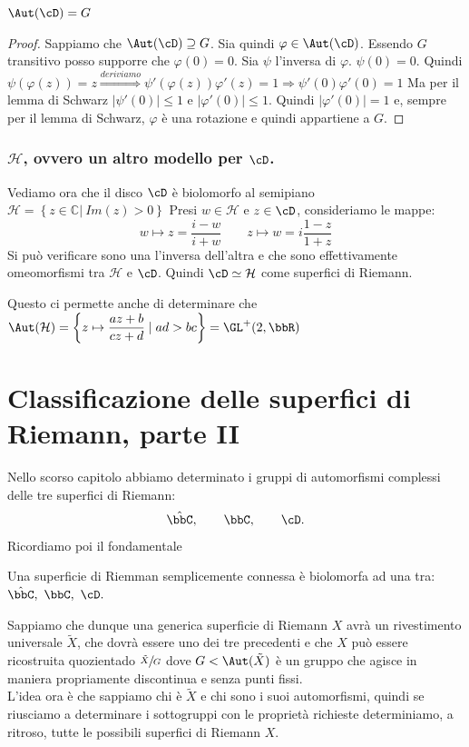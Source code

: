 \begin{proposizione}
$\Aut(\cD)=G$
\end{proposizione}
\begin{proof}
Sappiamo che $\Aut(\cD) \supseteq G$. Sia quindi $\varphi \in \Aut(\cD)$. Essendo $G$ transitivo posso supporre che $\varphi(0)=0$.
Sia $\psi$ l'inversa di $\varphi$. $\psi (0)=0$. Quindi
$\psi (\varphi (z))=z \stackrel{deriviamo}{\Longrightarrow} \psi ' (\varphi (z)) \varphi '(z) =1 \Rightarrow \psi'(0) \varphi'(0) =1$
Ma per il lemma di Schwarz $|\psi'(0)| \leq 1$ e $|\varphi'(0)| \leq 1$. Quindi $|\varphi'(0)|=1$ e, sempre per il lemma di Schwarz,
$\varphi$ è una rotazione e quindi appartiene a $G$.
\end{proof}

\subsection {$\mathcal{H}$, ovvero un altro modello per $\cD$.}

Vediamo ora che il disco $\cD$ è biolomorfo al semipiano $\mathcal{H} = \left \{ z \in \mathbb{C} | \ Im (z)>0 \right \}$
Presi $w \in \mathcal{H}$ e $z \in \cD$, consideriamo le mappe:
$$w \mapsto z=\frac{i-w}{i+w} \qquad z \mapsto w= i\frac{1-z}{1+z}$$
Si può verificare sono una l'inversa dell'altra e che sono effettivamente omeomorfismi tra $\mathcal{H}$ e $\cD$.
Quindi $\cD \simeq \mathcal{H}$ come superfici di Riemann.

Questo ci permette anche di determinare che $\Aut( \mathcal{H}) = \left \{ z \mapsto \displaystyle{\frac{az+b}{cz+d}} \mid ad > bc \right \} = \GL^+ (2, \bbR)$


\chapter{Classificazione delle superfici di Riemann, parte II}

Nello scorso capitolo abbiamo determinato i gruppi di automorfismi complessi delle tre superfici di Riemann:
$$
\hat{\bbC},\qquad \bbC, \qquad \cD.
$$
Ricordiamo poi il fondamentale
\begin{teorema}[Riemann] Una superficie di Riemman semplicemente connessa è biolomorfa ad una tra:
$\hat{\bbC},\ \bbC, \ \cD. $
\end{teorema}
Sappiamo che dunque una generica superficie di Riemann $X$ avrà un rivestimento universale $\tilde{X}$, che dovrà essere uno dei tre precedenti e che $X$ può essere ricostruita quozientado $\sfrac{\tilde{X}}{G}$ dove $G<\Aut(\tilde{X})$ è un gruppo che agisce in maniera propriamente discontinua e senza punti fissi.\\
L'idea ora è che sappiamo chi è $\tilde{X}$ e chi sono i suoi automorfismi, quindi se riusciamo a determinare i sottogruppi con le proprietà richieste determiniamo, a ritroso, tutte le possibili superfici di Riemann $X$.\\

